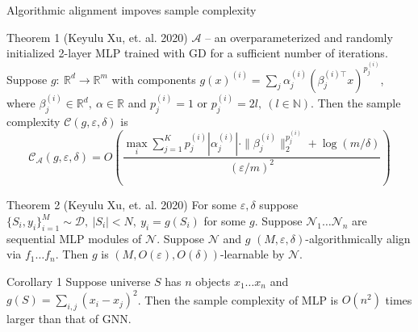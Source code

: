 \documentclass[10pt]{beamer}
\begin{document}
\begin{frame}{Algorithmic alignment impoves sample complexity}
	\begin{block}{Theorem 1 (Keyulu Xu, et. al. 2020)}
		$\mathcal{A}$ -- an overparameterized and randomly initialized 2-layer MLP trained with GD for a sufficient number of iterations.
		Suppose $g:~\mathbb{R}^d\to \mathbb{R}^m$ with components $g(x)^{(i)} = \sum_j \alpha_j^{(i)} \left(\beta_j^{(i)\top}x\right)^{p_j^{(i)}}$, where
		$\beta_j^{(i)}\in \mathbb{R}^d,~\alpha\in\mathbb{R}$ and $p_j^{(i)} = 1$ or $p_j^{(i)} = 2l,~(l\in \mathbb{N})$. 
		Then the sample complexity $\mathcal{C}(g, \varepsilon, \delta)$ is 
		\vspace{-0.4cm}
		\[\mathcal{C}_\mathcal{A}(g, \varepsilon, \delta) = O\left( \frac{\max_i\sum_{j=1}^{K} p_j^{(i)}|\alpha_j^{(i)}|\cdot\|\beta_j^{(i)}\|_2^{p_j^{(i)}} + \log (m / \delta)}{(\varepsilon / m)^2} \right)\]
	\end{block}

	\begin{block}{Theorem 2 (Keyulu Xu, et. al. 2020)}
		For some $\varepsilon, \delta$ suppose $\{S_i, y_i\}_{i=1}^M\sim \mathcal{D}, ~|S_i|< N,~ y_i = g(S_i)$ for some $g$. 
		Suppose $\mathcal{N}_1\dots \mathcal{N}_n$ are sequential MLP modules of $\mathcal{N}$. Suppose $\mathcal{N}$ and $g$ $(M, \varepsilon, \delta)$-algorithmically align via $f_1\dots f_n$.	
		Then $g$ is $(M, O(\varepsilon), O(\delta))$-learnable by $\mathcal{N}$.
	\end{block}

	\begin{block}{Corollary 1}
		Suppose universe $S$ has $n$ objects $x_1\dots x_n$ and $g(S) = \sum_{i,j} (x_i - x_j)^2$. Then the sample complexity 
		of MLP is $O(n^2)$ times larger than that of GNN.
	\end{block}
\end{frame}
\end{document}
